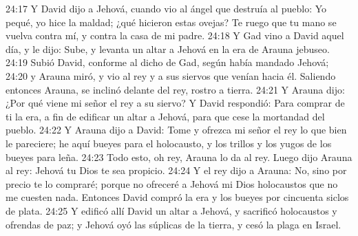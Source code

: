 24:17 Y David dijo a Jehová, cuando vio al ángel que destruía al pueblo: Yo pequé, yo hice la maldad; ¿qué hicieron estas ovejas? Te ruego que tu mano se vuelva contra mí, y contra la casa de mi padre.  
24:18 Y Gad vino a David aquel día, y le dijo: Sube, y levanta un altar a Jehová en la era de Arauna jebuseo.  
24:19 Subió David, conforme al dicho de Gad, según había mandado Jehová;  
24:20 y Arauna miró, y vio al rey y a sus siervos que venían hacia él. Saliendo entonces Arauna, se inclinó delante del rey, rostro a tierra.  
24:21 Y Arauna dijo: ¿Por qué viene mi señor el rey a su siervo? Y David respondió: Para comprar de ti la era, a fin de edificar un altar a Jehová, para que cese la mortandad del pueblo.  
24:22 Y Arauna dijo a David: Tome y ofrezca mi señor el rey lo que bien le pareciere; he aquí bueyes para el holocausto, y los trillos y los yugos de los bueyes para leña. 
24:23 Todo esto, oh rey, Arauna lo da al rey. Luego dijo Arauna al rey: Jehová tu Dios te sea propicio.  
24:24 Y el rey dijo a Arauna: No, sino por precio te lo compraré; porque no ofreceré a Jehová mi Dios holocaustos que no me cuesten nada. Entonces David compró la era y los bueyes por cincuenta siclos de plata.  
24:25 Y edificó allí David un altar a Jehová, y sacrificó holocaustos y ofrendas de paz; y Jehová oyó las súplicas de la tierra, y cesó la plaga en Israel.
